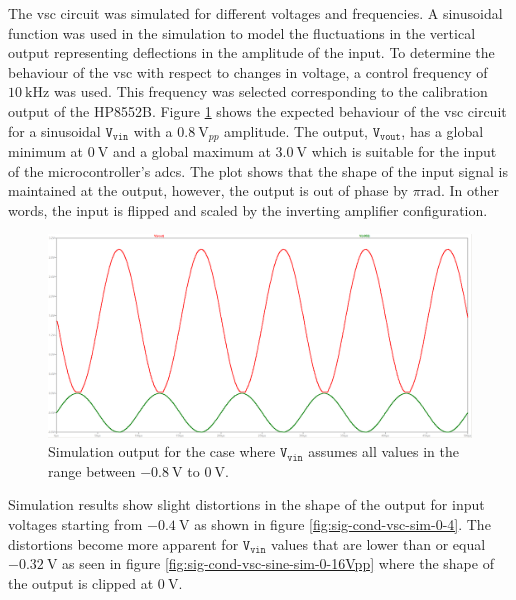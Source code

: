 \documentclass[class=report,11pt,crop=false]{standalone}
\begin{document}
	The \acrshort{vsc} circuit was simulated for different voltages and frequencies. A sinusoidal function was used in the simulation to model the fluctuations in the vertical output representing deflections in the amplitude of the input. To determine the behaviour of the \acrshort{vsc} with respect to changes in voltage, a control frequency of $\SI{10}{\kilo\hertz}$ was used. This frequency was selected corresponding to the calibration output of the HP8552B. Figure \ref{fig:sig-cond-vsc-sine-sim-output} shows the expected behaviour of the \acrshort{vsc} circuit for a sinusoidal $\texttt{V}_\texttt{vin}$ with a $\SI{0.8}{\volt}_{pp}$ amplitude. The output, $\texttt{V}_\texttt{vout}$, has a global minimum at $\SI{0}{\volt}$ and a global maximum at $\SI{3.0}{\volt}$ which is suitable for the input of the microcontroller's \acrshort{adc}s. The plot shows that the shape of the input signal is maintained at the output, however, the output is out of phase by $\pi\si{\radian}$. In other words, the input is flipped and scaled by the inverting amplifier configuration. 
	
	\begin{figure}[h!]
		\centering
		\includegraphics[width=0.7\linewidth]{Figures/Methodology/sig-cond-vsc-sine-sim-output}
		\caption{Simulation output for the case where $\texttt{V}_\texttt{vin}$ assumes all values in the range between $-\SI{0.8}{\volt}$ to $\SI{0}{\volt}$.}
		\label{fig:sig-cond-vsc-sine-sim-output}
	\end{figure} 

	Simulation results show slight distortions in the shape of the output for input voltages starting from $-\SI{0.4}{\volt}$ as shown in figure \ref{fig:sig-cond-vsc-sim-0-4}. The distortions become more apparent for $\texttt{V}_\texttt{vin}$ values that are lower than or equal $-\SI{0.32}{\volt}$ as seen in figure \ref{fig:sig-cond-vsc-sine-sim-0-16Vpp} where the shape of the output is clipped at $\SI{0}{\volt}$. 
	
\end{document}
